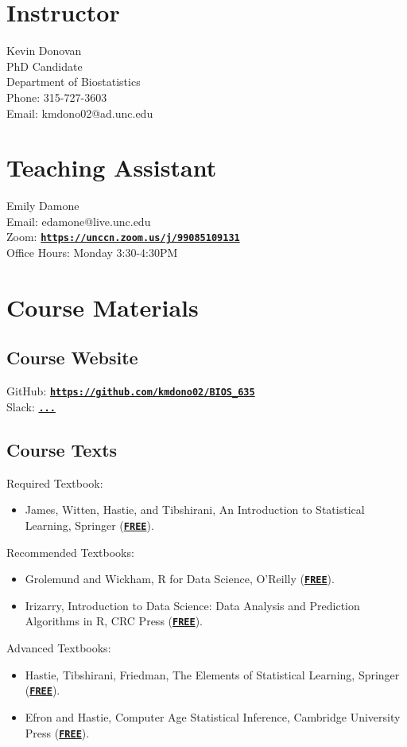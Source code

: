 \documentclass[11pt]{article}
\begin{document}
\section*{Instructor}
Kevin Donovan\\
PhD Candidate\\
Department of Biostatistics\\
Phone: 315-727-3603\\
Email: kmdono02@ad.unc.edu

\section*{Teaching Assistant}
Emily Damone\\ 
Email: edamone@live.unc.edu\\
Zoom: \href{https://unccn.zoom.us/j/99085109131}{\tt\bf https://unccn.zoom.us/j/99085109131}\\
Office Hours: Monday 3:30-4:30PM

\section*{Course Materials}
\subsection*{Course Website}
GitHub: \href{https://github.com/kmdono02/BIOS_635}{\tt\bf https://github.com/kmdono02/BIOS\_635}\\
Slack: \href{...}{\tt\bf ...}
\subsection*{Course Texts}
Required Textbook:
\begin{itemize}
\item James, Witten, Hastie, and Tibshirani, An Introduction to Statistical Learning, Springer (\href{https://statlearning.com/}{\tt\bf FREE}).
\end{itemize}
Recommended Textbooks:
\begin{itemize}
\item Grolemund and Wickham, R for Data Science, O’Reilly (\href{https://r4ds.had.co.nz/}{\tt\bf FREE}).
\item Irizarry, Introduction to Data Science: Data Analysis and Prediction Algorithms in R, CRC Press (\href{https://rafalab.github.io/dsbook/}{\tt\bf FREE}).
\end{itemize}
Advanced Textbooks:
\begin{itemize}
\item Hastie, Tibshirani, Friedman, The Elements of Statistical Learning, Springer (\href{https://web.stanford.edu/~hastie/ElemStatLearn/}{\tt\bf FREE}).
\item Efron and Hastie, Computer Age Statistical Inference, Cambridge University Press (\href{https://web.stanford.edu/~hastie/CASI_files/PDF/casi.pdf}{\tt\bf FREE}).
\end{itemize}
\end{document}
